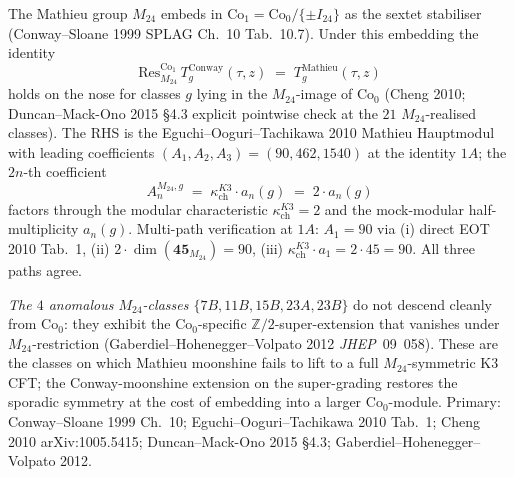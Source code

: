 \begin{remark}%
\label{rem:bkm-conway-m24-descent}%
%
%
The Mathieu group $M_{24}$ embeds in
$\mathrm{Co}_1 = \mathrm{Co}_0/\{\pm I_{24}\}$ as the sextet
stabiliser (Conway--Sloane 1999 SPLAG Ch.~10 Tab.~10.7). Under this
embedding the identity
\[
 \mathrm{Res}^{\mathrm{Co}_1}_{M_{24}}\, T_g^{\mathrm{Conway}}(\tau, z)
 \;=\;
 T_g^{\mathrm{Mathieu}}(\tau, z)
\]
holds on the nose for classes $g$ lying in the $M_{24}$-image of
$\mathrm{Co}_0$ (Cheng 2010; Duncan--Mack-Ono 2015 \S 4.3 explicit
pointwise check at the $21$ $M_{24}$-realised classes). The RHS is
the Eguchi--Ooguri--Tachikawa 2010 Mathieu Hauptmodul with leading
coefficients $(A_1, A_2, A_3) = (90, 462, 1540)$ at the identity
$1A$; the $2n$-th coefficient
\[
 A_n^{M_{24}, g} \;=\; \kappa_{\mathrm{ch}}^{K3} \cdot a_n(g)
 \;=\; 2 \cdot a_n(g)
\]
factors through the modular characteristic
$\kappa_{\mathrm{ch}}^{K3} = 2$ and the mock-modular half-multiplicity
$a_n(g)$. Multi-path verification at $1A$: $A_1 = 90$ via (i) direct
EOT 2010 Tab.~1, (ii) $2 \cdot \dim(\mathbf{45}_{M_{24}}) = 90$, (iii)
$\kappa_{\mathrm{ch}}^{K3} \cdot a_1 = 2 \cdot 45 = 90$. All three
paths agree.

\emph{The $4$ anomalous $M_{24}$-classes $\{7B, 11B, 15B, 23A, 23B\}$}
do not descend cleanly from $\mathrm{Co}_0$: they exhibit the
$\mathrm{Co}_0$-specific $\mathbb{Z}/2$-super-extension that vanishes
under $M_{24}$-restriction (Gaberdiel--Hohenegger--Volpato 2012
\emph{JHEP}~09~058). These are the classes on which Mathieu
moonshine fails to lift to a full $M_{24}$-symmetric K3 CFT; the
Conway-moonshine extension on the super-grading restores the
sporadic symmetry at the cost of embedding into a larger
$\mathrm{Co}_0$-module.
Primary: Conway--Sloane 1999 Ch.~10;
Eguchi--Ooguri--Tachikawa 2010 Tab.~1;
Cheng 2010 arXiv:1005.5415; Duncan--Mack-Ono 2015 \S 4.3;
Gaberdiel--Hohenegger--Volpato 2012.
\end{remark}

